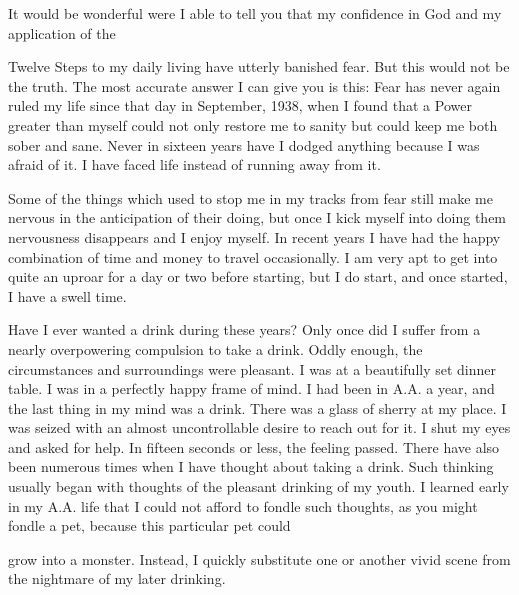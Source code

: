 \begin{biblechapter}
It would be wonderful were I able to tell you that my confidence in God and my application of the

Twelve Steps to my daily living have utterly banished fear. But this would not be the truth. The most accurate answer I can give you is this: Fear has never again ruled my life since that day in September, 1938, when I found that a Power greater than myself could not only restore me to sanity but could keep me both sober and sane. Never in sixteen years have I dodged anything because I was afraid of it. I have faced life instead of running away from it.

Some of the things which used to stop me in my tracks from fear still make me nervous in the anticipation of their doing, but once I kick myself into doing them nervousness disappears and I enjoy myself. In recent years I have had the happy combination of time and money to travel occasionally. I am very apt to get into quite an uproar for a day or two before starting, but I do start, and once started, I have a swell time.

Have I ever wanted a drink during these years? Only once did I suffer from a nearly overpowering compulsion to take a drink. Oddly enough, the circumstances and surroundings were pleasant. I was at a beautifully set dinner table. I was in a perfectly happy frame of mind. I had been in A.A. a year, and the last thing in my mind was a drink. There was a glass of sherry at my place. I was seized with an almost uncontrollable desire to reach out for it. I shut my eyes and asked for help. In fifteen seconds or less, the feeling passed. There have also been numerous times when I have thought about taking a drink. Such thinking usually began with thoughts of the pleasant drinking of my youth. I learned early in my A.A. life that I could not afford to fondle such thoughts, as you might fondle a pet, because this particular pet could

grow into a monster. Instead, I quickly substitute one or another vivid scene from the nightmare of my later drinking.


\end{biblechapter}
